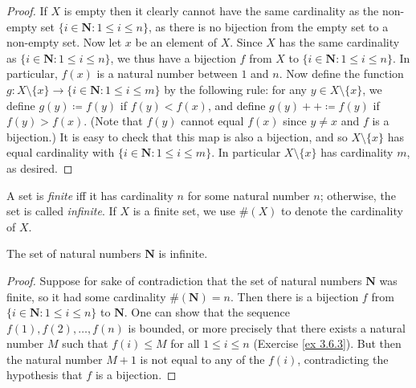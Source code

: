 \begin{proof}
    If \(X\) is empty then it clearly cannot have the same cardinality as the non-empty set \(\{i \in \mathbf{N} : 1 \leq i \leq n\}\), as there is no bijection from the empty set to a non-empty set.
    Now let \(x\) be an element of \(X\).
    Since \(X\) has the same cardinality as \(\{i \in \mathbf{N} : 1 \leq i \leq n\}\), we thus have a bijection \(f\) from \(X\) to \(\{i \in \mathbf{N} : 1 \leq i \leq n\}\).
    In particular, \(f(x)\) is a natural number between \(1\) and \(n\).
    Now define the function \(g : X \setminus \{x\} \to \{i \in \mathbf{N} : 1 \leq i \leq m\}\) by the following rule: for any \(y \in X \setminus \{x\}\), we define \(g(y) \coloneqq f(y)\) if \(f(y) < f(x)\), and define \(g(y)++ \coloneqq f(y)\) if \(f(y) > f(x)\).
    (Note that \(f(y)\) cannot equal \(f(x)\) since \(y \neq x\) and \(f\) is a bijection.)
    It is easy to check that this map is also a bijection, and so \(X \setminus \{x\}\) has equal cardinality with \(\{i \in \mathbf{N} : 1 \leq i \leq m\}\).
    In particular \(X \setminus \{x\}\) has cardinality \(m\), as desired.
\end{proof}

\begin{definition}\label{3.6.10}
    A set is \emph{finite} iff it has cardinality \(n\) for some natural number \(n\);
    otherwise, the set is called \emph{infinite}.
    If \(X\) is a finite set, we use \(\#(X)\) to denote the cardinality of \(X\).
\end{definition}

\setcounter{theorem}{11}
\begin{theorem}\label{3.6.12}
    The set of natural numbers \(\mathbf{N}\) is infinite.
\end{theorem}

\begin{proof}
    Suppose for sake of contradiction that the set of natural numbers \(\mathbf{N}\) was finite, so it had some cardinality \(\#(\mathbf{N}) = n\).
    Then there is a bijection \(f\) from \(\{i \in \mathbf{N} : 1 \leq i \leq n\}\) to \(\mathbf{N}\).
    One can show that the sequence \(f(1), f(2), \dots, f(n)\) is bounded, or more precisely that there exists a natural number \(M\) such that \(f(i) \leq M\) for all \(1 \leq i \leq n\) (Exercise \ref{ex 3.6.3}).
    But then the natural number \(M+1\) is not equal to any of the \(f(i)\), contradicting the hypothesis that \(f\) is a bijection.
\end{proof}

